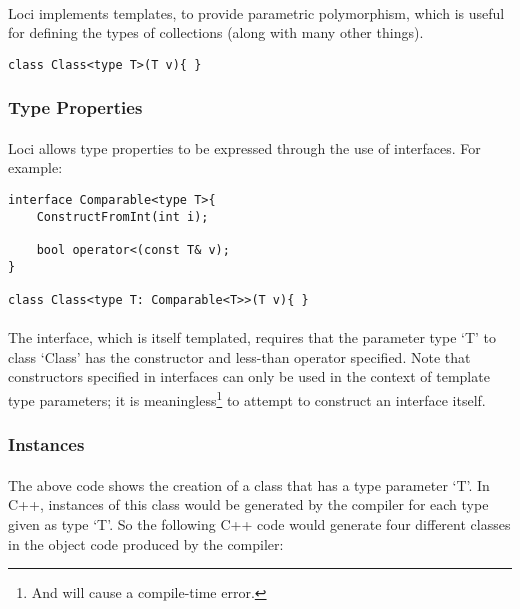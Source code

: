 \documentclass[12pt,twoside,notitlepage]{report}
\begin{document}
\paragraph{}
Loci implements templates, to provide parametric polymorphism, which is useful for defining the types of collections (along with many other things).

\small{
\begin{verbatim}
class Class<type T>(T v){ }
\end{verbatim}
}

\subsubsection{Type Properties}

\paragraph{}
Loci allows type properties to be expressed through the use of interfaces. For example:

\small{
\begin{verbatim}
interface Comparable<type T>{
    ConstructFromInt(int i);

    bool operator<(const T& v);
}

class Class<type T: Comparable<T>>(T v){ }
\end{verbatim}
}

\paragraph{}
The interface, which is itself templated, requires that the parameter type `T' to class `Class' has the constructor and less-than operator specified. Note that constructors specified in interfaces can only be used in the context of template type parameters; it is meaningless\footnote{And will cause a compile-time error.} to attempt to construct an interface itself.

\subsubsection{Instances}

\paragraph{}
The above code shows the creation of a class that has a type parameter `T'. In C++, instances of this class would be generated by the compiler for each type given as type `T'. So the following C++ code would generate four different classes in the object code produced by the compiler:
\end{document}
